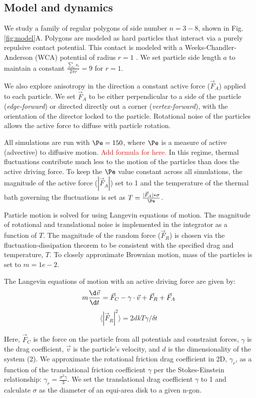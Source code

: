 \subsection*{Model and dynamics}

We study a family of regular polygons of side number $n=3-8$, shown in Fig. \ref{fig:model}A.
Polygons are modeled as hard particles that interact via a purely repulsive contact potential.
This contact is modeled with a Weeks-Chandler-Anderson (WCA) potential of radius $r=1$ \cite{WCA_1971}.
We set particle side length $a$ to maintain a constant $\frac{\sum_is_i}{2\pi r}=9$ for $r=1$.

We also explore anisotropy in the direction a constant active force ($\vec{F}_A$) applied to each particle.
We set $\vec{F}_A$ to be either perpendicular to a side of the particle (\textit{edge-forward}) or directed directly out a corner (\textit{vertex-forward}), with the orientation of the director locked to the particle.
Rotational noise of the particles allows the active force to diffuse with particle rotation. %

All simulations are run with $\Pe=150$, where $\Pe$ is a measure of active (advective) to diffusive motion. \textcolor{red}{Add formula for \Pe here.}
In this regime, thermal fluctuations contribute much less to the motion of the particles than does the active driving force.
To keep the $\Pe$ value constant across all simulations, the magnitude of the active force ($|\vec{F}_A|$) set to 1 and the temperature of the thermal bath governing the fluctuations is set as $T = \frac{|\vec{F}_A|*\sigma}{\Pe}$.

Particle motion is solved for using Langevin equations of motion.
The magnitude of rotational and translational noise is implemented in the integrator as a function of $T$.
The magnitude of the random force ($\vec{F}_R$) is chosen via the fluctuation-dissipation theorem to be consistent with the specified drag and temperature, $T$.
To closely approximate Brownian motion, mass of the particles is set to $m=1e-2$.

The Langevin equations of motion with an active driving force are given by:
$$ m\frac{\d\vec{v}}{\d t} = \vec{F}_C - \gamma\cdot\vec{v} + \vec{F}_R + \vec{F}_A $$
$$ \langle |\vec{F}_R|^2\rangle = 2dkT\gamma/\delta t$$

Here, $\vec{F}_C$ is the force on the particle from all potentials and constraint forces, $\gamma$ is the drag coefficient, $\vec{v}$ is the particle's velocity, and $d$ is the dimensionality of the system (2). 
We approximate the rotational friction drag coefficient in 2D, $\gamma_r$, as a function of the translational friction coefficient $\gamma$ per the Stokes-Einstein relationship: $\gamma_r = \frac{\sigma^2\gamma}{3}$.
We set the translational drag coefficient $\gamma$ to 1 and calculate $\sigma$ as the diameter of an equi-area disk to a given n-gon.


